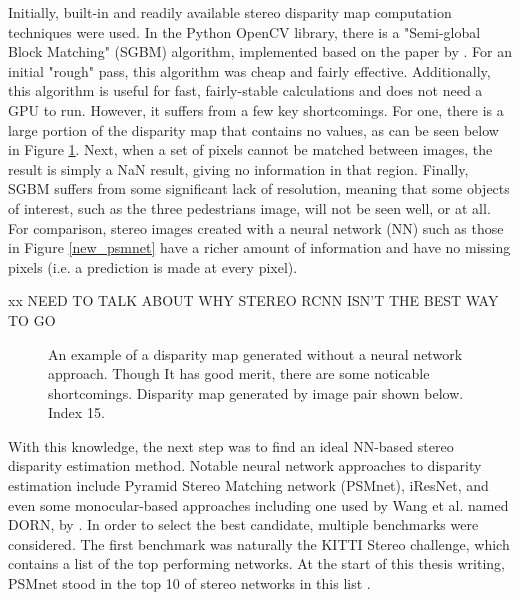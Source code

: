 Initially, built-in and readily available stereo disparity map computation techniques were used. In the Python OpenCV library, there is a "Semi-global Block Matching" (SGBM) algorithm, implemented based on the paper by \cite{hirschmuller2007stereo}. For an initial "rough" pass, this algorithm was cheap and fairly effective. Additionally, this algorithm is useful for fast, fairly-stable calculations and does not need a GPU to run. However, it suffers from a few key shortcomings. For one, there is a large portion of the disparity map that contains no values, as can be seen below in Figure \ref{ind15_SGBM_comparison}. Next, when a set of pixels cannot be matched between images, the result is simply a NaN result, giving no information in that region. Finally, SGBM suffers from some significant lack of resolution, meaning that some objects of interest, such as the three pedestrians image, will not be seen well, or at all. For comparison, stereo images created with a neural network (NN) such as those in Figure \ref{new_psmnet} have a richer amount of information and have no missing pixels (i.e. a prediction is made at every pixel). 

xx NEED TO TALK ABOUT WHY STEREO RCNN ISN'T THE BEST WAY TO GO


\begin{figure}[h]
    \centering
    \caption{An example of a disparity map generated without a neural network approach. Though It has good merit, there are some noticable shortcomings. Disparity map generated by image pair shown below. Index 15.}
    \label{ind15_SGBM_comparison}
\end{figure}


With this knowledge, the next step was to find an ideal NN-based stereo disparity estimation method. Notable neural network approaches to disparity estimation include Pyramid Stereo Matching network (PSMnet),  iResNet, and even some monocular-based approaches including one used by Wang et al. named DORN, by  \cite{DBLP:journals/corr/abs-1806-02446}. In order to select the best candidate, multiple benchmarks were considered. The first benchmark was naturally the KITTI Stereo challenge, which contains a list of the top performing networks. At the start of this thesis writing, PSMnet stood in the top 10 of stereo networks in this list \cite{menze_kitti_2019}. 

